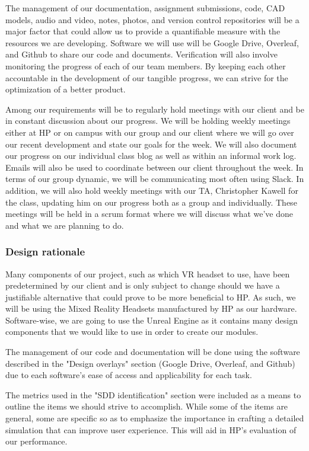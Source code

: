 \documentclass[onecolumn, draftclsnofoot,10pt, compsoc]{IEEEtran}
\begin{document}
The management of our documentation, assignment submissions, code, CAD models, audio and video, notes, photos, and version control repositories will be a major factor that could allow us to provide a quantifiable measure with the resources we are developing. Software we will use will be Google Drive, Overleaf, and Github to share our code and documents. Verification will also involve monitoring the progress of each of our team members. By keeping each other accountable in the development of our tangible progress, we can strive for the optimization of a better product. 

Among our requirements will be to regularly hold meetings with our client and be in constant discussion about our progress. We will be holding weekly meetings either at HP or on campus with our group and our client where we will go over our recent development and state our goals for the week. We will also document our progress on our individual class blog as well as within an informal work log. Emails will also be used to coordinate between our client throughout the week. In terms of our group dynamic, we will be communicating most often using Slack. In addition, we will also hold weekly meetings with our TA, Christopher Kawell for the class, updating him on our progress both as a group and individually. These meetings will be held in a scrum format where we will discuss what we've done and what we are planning to do. 
\subsubsection{Design rationale}
Many components of our project, such as which VR headset to use, have been predetermined by our client and is only subject to change should we have a justifiable alternative that could prove to be more beneficial to HP. As such, we will be using the Mixed Reality Headsets manufactured by HP as our hardware. Software-wise, we are going to use the Unreal Engine as it contains many design components that we would like to use in order to create our modules. 

The management of our code and documentation will be done using the software described in the "Design overlays" section (Google Drive, Overleaf, and Github) due to each software's ease of access and applicability for each task. 

The metrics used in the "SDD identification" section were included as a means to outline the items we should strive to accomplish. While some of the items are general, some are specific so as to emphasize the importance in crafting a detailed simulation that can improve user experience. This will aid in HP's evaluation of our performance. 
\end{document}
